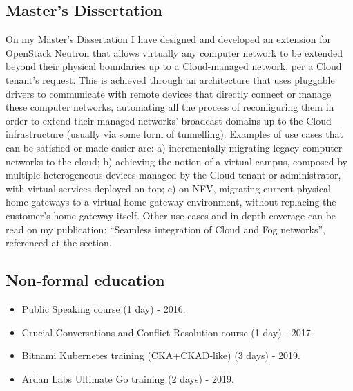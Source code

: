 \documentclass[letter,10pt]{article} %
\begin{document}
\subsection{Master's Dissertation}
On my Master's Dissertation I have designed and developed an extension for OpenStack Neutron that allows virtually any computer network to be extended beyond their physical boundaries up to a Cloud-managed network, per a Cloud tenant's request. This is achieved through an architecture that uses pluggable drivers to communicate with remote devices that directly connect or manage these computer networks, automating all the process of reconfiguring them in order to extend their managed networks' broadcast domains up to the Cloud infrastructure (usually via some form of tunnelling). Examples of use cases that can be satisfied or made easier are: a) incrementally migrating legacy computer networks to the cloud; b) achieving the notion of a virtual campus, composed by multiple heterogeneous devices managed by the Cloud tenant or administrator, with virtual services deployed on top; c) on NFV, migrating current physical home gateways to a virtual home gateway environment, without replacing the customer's home gateway itself. Other use cases and in-depth coverage can be read on my publication: ``Seamless integration of Cloud and Fog networks'', referenced at the  section.

\subsection{Non-formal education}
\begin{itemize}
    \item Public Speaking course (1 day) - 2016.
    \item Crucial Conversations and Conflict Resolution course (1 day) - 2017.
    \item Bitnami Kubernetes training (CKA+CKAD-like) (3 days) - 2019.
    \item Ardan Labs Ultimate Go training (2 days) - 2019.
\end{itemize}

\end{document}

